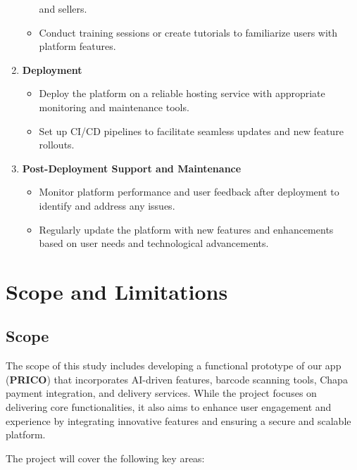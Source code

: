 \documentclass[12pt]{report}
\begin{document}
\begin{enumerate}
\begin{itemize}
		            and sellers.
		      \item Conduct training sessions or create tutorials to familiarize users with
		            platform features.
	      \end{itemize}
	\item \textbf{Deployment}
	      \begin{itemize}
		      \item Deploy the platform on a reliable hosting service with appropriate
		            monitoring and maintenance tools.
		      \item Set up CI/CD pipelines to facilitate seamless updates and new feature
		            rollouts.
	      \end{itemize}
	\item \textbf{Post-Deployment Support and Maintenance}
	      \begin{itemize}
		      \item Monitor platform performance and user feedback after deployment to
		            identify and address any issues.
		      \item Regularly update the platform with new features and enhancements
		            based on user needs and technological advancements.
	      \end{itemize}
\end{enumerate}

\section{Scope and Limitations}

\subsection{Scope}

The scope of this study includes developing a functional prototype of our app (\textbf{PRICO}) that
incorporates AI-driven features, barcode scanning tools, Chapa payment integration, and
delivery services. While the project focuses on delivering core functionalities, it also aims to
enhance user engagement and experience by integrating innovative features and ensuring a
secure and scalable platform.

The project will cover the following key areas:
\end{document}
